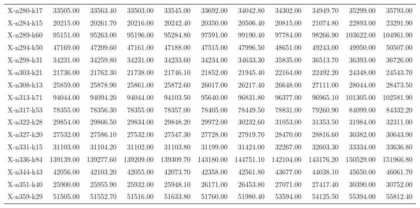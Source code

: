 \documentclass[letterpaper]{article} %
\begin{document}
\begin{longtable}{@{}l rr rr rr rr rr@{}}
X-n280-k17 & 33505.00 & 33563.40 & 33503.00 & 33545.00 & 33692.00 & 34042.80 & 34302.00 & 34949.70 & 35299.00 & 35793.00 \\
X-n284-k15 & 20215.00 & 20261.70 & 20216.00 & 20242.40 & 20350.00 & 20506.40 & 20815.00 & 21074.80 & 22893.00 & 23291.90 \\
X-n289-k60 & 95151.00 & 95263.00 & 95196.00 & 95284.80 & 97591.00 & 99190.40 & 97784.00 & 98266.90 & 103622.00 & 104961.90 \\
X-n294-k50 & 47169.00 & 47209.60 & 47161.00 & 47188.00 & 47515.00 & 47996.50 & 48651.00 & 49243.00 & 49950.00 & 50507.00 \\
X-n298-k31 & 34231.00 & 34259.80 & 34231.00 & 34233.60 & 34234.00 & 34633.30 & 35835.00 & 36513.70 & 36393.00 & 36726.00 \\
X-n303-k21 & 21736.00 & 21762.30 & 21738.00 & 21746.10 & 21852.00 & 21945.40 & 22164.00 & 22492.20 & 24348.00 & 24543.70 \\
X-n308-k13 & 25859.00 & 25878.90 & 25861.00 & 25872.60 & 26017.00 & 26217.40 & 26648.00 & 27111.00 & 28044.00 & 28473.50 \\
X-n313-k71 & 94044.00 & 94094.20 & 94044.00 & 94103.50 & 95640.00 & 96831.80 & 96377.00 & 96965.10 & 101305.00 & 102581.90 \\
X-n317-k53 & 78355.00 & 78356.30 & 78355.00 & 78357.00 & 78405.00 & 78449.50 & 78831.00 & 79260.90 & 84099.00 & 84332.20 \\
X-n322-k28 & 29854.00 & 29866.50 & 29834.00 & 29848.20 & 29972.00 & 30232.60 & 31053.00 & 31353.50 & 31984.00 & 32311.00 \\
X-n327-k20 & 27532.00 & 27586.10 & 27532.00 & 27547.30 & 27728.00 & 27919.70 & 28470.00 & 28816.60 & 30382.00 & 30643.90 \\
X-n331-k15 & 31103.00 & 31104.20 & 31102.00 & 31103.80 & 31199.00 & 31424.00 & 32267.00 & 32603.30 & 33334.00 & 33636.80 \\
X-n336-k84 & 139139.00 & 139277.60 & 139209.00 & 139309.70 & 143180.00 & 144751.10 & 142104.00 & 143176.20 & 150529.00 & 151966.80 \\
X-n344-k43 & 42056.00 & 42103.20 & 42055.00 & 42073.70 & 42358.00 & 42561.80 & 43677.00 & 44038.10 & 45650.00 & 46061.70 \\
X-n351-k40 & 25900.00 & 25955.90 & 25932.00 & 25948.10 & 26171.00 & 26453.80 & 27071.00 & 27417.40 & 30390.00 & 30752.00 \\
X-n359-k29 & 51505.00 & 51552.70 & 51516.00 & 51633.80 & 51760.00 & 51980.40 & 53594.00 & 54125.50 & 55394.00 & 55812.40 \\

\end{longtable}
\end{document}
